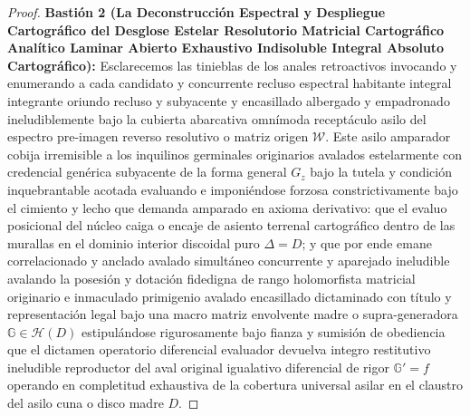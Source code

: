 \documentclass[11pt,a4paper]{article}
\theoremstyle{definition}
\theoremstyle{remark}
\numberwithin{equation}{section}
\begin{document}
\begin{proof}
\textbf{Bastión 2 (La Deconstrucción Espectral y Despliegue Cartográfico del Desglose Estelar Resolutorio Matricial Cartográfico Analítico Laminar Abierto Exhaustivo Indisoluble Integral Absoluto Cartográfico):} 
Esclarecemos las tinieblas de los anales retroactivos invocando y enumerando a cada candidato y concurrente recluso espectral habitante integral integrante oriundo recluso y subyacente y encasillado albergado y empadronado ineludiblemente bajo la cubierta abarcativa omnímoda receptáculo asilo del espectro pre-imagen reverso resolutivo o matriz origen $\mathcal{W}$. Este asilo amparador cobija irremisible a los inquilinos germinales originarios avalados estelarmente con credencial genérica subyacente de la forma general $G_z$ bajo la tutela y condición inquebrantable acotada evaluando e imponiéndose forzosa constrictivamente bajo el cimiento y lecho que demanda amparado en axioma derivativo: que el evaluo posicional del núcleo caiga o encaje de asiento terrenal cartográfico dentro de las murallas en el dominio interior discoidal puro $\Delta=D$; y que por ende emane correlacionado y anclado avalado simultáneo concurrente y aparejado ineludible avalando la posesión y dotación fidedigna de rango holomorfista matricial originario e inmaculado primigenio avalado encasillado dictaminado con título y representación legal bajo una macro matriz envolvente madre o supra-generadora $\mathbb{G} \in \mathcal{H}(D)$ estipulándose rigurosamente bajo fianza y sumisión de obediencia que el dictamen operatorio diferencial evaluador devuelva integro restitutivo ineludible reproductor del aval original igualativo diferencial de rigor $\mathbb{G}' = f$ operando en completitud exhaustiva de la cobertura universal asilar en el claustro del asilo cuna o disco madre $D$.

\end{proof}
\end{document}
